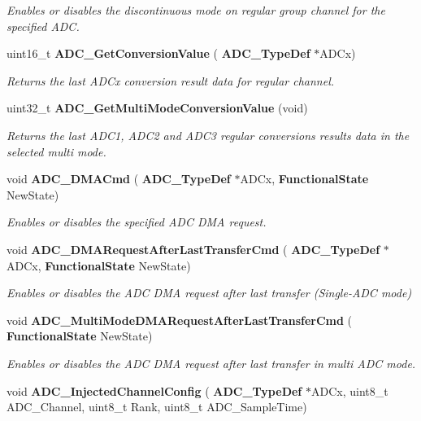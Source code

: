 \begin{DoxyCompactItemize}
\begin{DoxyCompactList}\small\item\em Enables or disables the discontinuous mode on regular group channel for the specified A\+DC. \end{DoxyCompactList}\item 
uint16\+\_\+t \textbf{ A\+D\+C\+\_\+\+Get\+Conversion\+Value} (\textbf{ A\+D\+C\+\_\+\+Type\+Def} $\ast$A\+D\+Cx)
\begin{DoxyCompactList}\small\item\em Returns the last A\+D\+Cx conversion result data for regular channel. \end{DoxyCompactList}\item 
uint32\+\_\+t \textbf{ A\+D\+C\+\_\+\+Get\+Multi\+Mode\+Conversion\+Value} (void)
\begin{DoxyCompactList}\small\item\em Returns the last A\+D\+C1, A\+D\+C2 and A\+D\+C3 regular conversions results data in the selected multi mode. \end{DoxyCompactList}\item 
void \textbf{ A\+D\+C\+\_\+\+D\+M\+A\+Cmd} (\textbf{ A\+D\+C\+\_\+\+Type\+Def} $\ast$A\+D\+Cx, \textbf{ Functional\+State} New\+State)
\begin{DoxyCompactList}\small\item\em Enables or disables the specified A\+DC D\+MA request. \end{DoxyCompactList}\item 
void \textbf{ A\+D\+C\+\_\+\+D\+M\+A\+Request\+After\+Last\+Transfer\+Cmd} (\textbf{ A\+D\+C\+\_\+\+Type\+Def} $\ast$A\+D\+Cx, \textbf{ Functional\+State} New\+State)
\begin{DoxyCompactList}\small\item\em Enables or disables the A\+DC D\+MA request after last transfer (Single-\/\+A\+DC mode) \end{DoxyCompactList}\item 
void \textbf{ A\+D\+C\+\_\+\+Multi\+Mode\+D\+M\+A\+Request\+After\+Last\+Transfer\+Cmd} (\textbf{ Functional\+State} New\+State)
\begin{DoxyCompactList}\small\item\em Enables or disables the A\+DC D\+MA request after last transfer in multi A\+DC mode. \end{DoxyCompactList}\item 
void \textbf{ A\+D\+C\+\_\+\+Injected\+Channel\+Config} (\textbf{ A\+D\+C\+\_\+\+Type\+Def} $\ast$A\+D\+Cx, uint8\+\_\+t A\+D\+C\+\_\+\+Channel, uint8\+\_\+t Rank, uint8\+\_\+t A\+D\+C\+\_\+\+Sample\+Time)

\end{DoxyCompactItemize}
